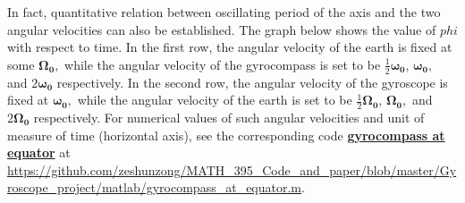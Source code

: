 \documentclass[12pt]{article}
\renewcommand{\(}{\left (}
\renewcommand{\)}{\right )}
\renewcommand{\vec}[1]{\boldsymbol{#1}}
\begin{document}
In fact, quantitative relation between oscillating period of the axis and the two angular velocities can also be established. The graph below shows the value of $phi$ with respect to time. In the first row, the angular velocity of the earth is fixed at some $\vec{\Omega_0},$ while the angular velocity of the gyrocompass is set to be $\frac{1}{2}\vec{\omega_0}$, $\vec{\omega_0},$ and $2\vec{\omega_0}$ respectively. In the second row, the angular velocity of the gyroscope is fixed at $\vec{\omega_0},$ while the angular velocity of the earth is set to be $\frac{1}{2}\vec{\Omega_0}$, $\vec{\Omega_0},$ and $2\vec{\Omega_0}$ respectively. For numerical values of such angular velocities and unit of measure of time (horizontal axis), see the corresponding code \href{https://github.com/zeshunzong/MATH_395_Code_and_paper/blob/master/Gyroscope_project/matlab/gyrocompass_at_equator.m}{\textbf{gyrocompass at equator}} at \url{https://github.com/zeshunzong/MATH_395_Code_and_paper/blob/master/Gyroscope_project/matlab/gyrocompass_at_equator.m}.
\end{document}
